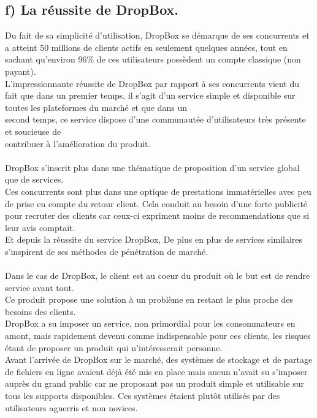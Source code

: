 \documentclass[a4paper, 10pt]{article}
\begin{document}
\subsection*{f) La réussite de DropBox.}
Du fait de sa simplicité d'utilisation, DropBox se démarque de ses concurrents et
a atteint 50 millions de clients actifs en seulement quelques années,
tout en sachant qu'environ 96\% de ces utilisateurs possèdent un compte classique (non payant).\\
L'impressionnante réussite de DropBox par rapport à ses concurrents vient du fait que dans un premier temps,
il s'agit d'un service simple et disponible sur toutes les plateformes du marché et
que dans un\\second temps, ce service dispose d'une communautée d'utilisateurs très présente et soucieuse
de\\contribuer à l'amélioration du produit.\\ \\
DropBox s'inscrit plus dans une thématique de proposition d'un service global que de services.\\
Ces concurrents sont plus dans une optique de prestations immatérielles avec peu de prise en compte du retour client.
Cela conduit au besoin d'une forte publicité pour recruter des clients
car ceux-ci expriment moins de recommendations que si leur avis comptait.\\
Et depuis la réussite du service DropBox,
De plus en plus de services similaires s'inspirent de ses méthodes de pénétration de marché.\\ \\
Dans le cas de DropBox, le client est au coeur du produit où le but est de rendre service avant tout.\\
Ce produit propose une solution à un problème en restant le plus proche des besoins des clients.\\
DropBox a su imposer un service, non primordial pour les consommateurs en amont,
mais rapidement devenu comme indispensable pour ces clients, les risques étant de proposer un produit qui n'intéresserait personne.\\
Avant l'arrivée de DropBox sur le marché, des systèmes de stockage et de partage de fichiers en ligne avaient déjà été mis en place
mais aucun n'avait su s'imposer auprès du grand public car ne proposant pas un produit simple et utilisable sur tous les supports disponibles.
Ces systèmes étaient plutôt utilisés par des utilisateurs aguerris et non novices.\\ \\
\end{document}
